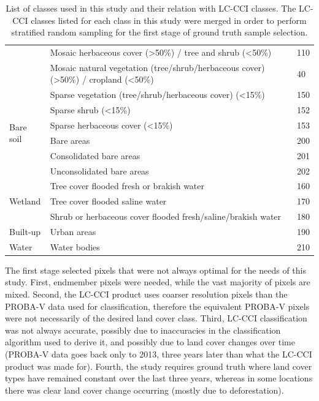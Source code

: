 \documentclass[a4paper,10pt]{book}
\begin{document}
\begin{table}
\begin{center}
{\begin{tabular}{lp{9cm}l}
	  & Mosaic herbaceous cover (>50\%) / tree and shrub (<50\%) & 110 \\
	  & Mosaic natural vegetation (tree/shrub/herbaceous cover) (>50\%) / cropland (<50\%) & 40 \\
	\hline
	\multirow{6}{*}{Bare soil} & Sparse vegetation (tree/shrub/herbaceous cover) (<15\%) & 150 \\
	  & Sparse shrub (<15\%) & 152 \\
	  & Sparse herbaceous cover (<15\%) & 153 \\
	  & Bare areas & 200 \\
	  & Consolidated bare areas & 201 \\
	  & Unconsolidated bare areas & 202 \\
	\hline
	\multirow{3}{*}{Wetland} & Tree cover flooded fresh or brakish water & 160 \\
	  & Tree cover flooded saline water & 170 \\
	  & Shrub or herbaceous cover flooded fresh/saline/brakish water & 180 \\
	\hline
	Built-up & Urban areas & 190 \\
	\hline
	Water & Water bodies & 210 \\
	\hline
      \end{tabular}
    }
  \end{center}
  \caption{List of classes used in this study and their relation with LC-CCI classes. The LC-CCI classes listed for each class in this study were merged in order to perform stratified random sampling for the first stage of ground truth sample selection.}
  \label{tbl-classes}
\end{table}

The first stage selected pixels that were not always optimal for the needs of this study. First, endmember pixels were needed, while the vast majority of pixels are mixed. Second, the LC-CCI product uses coarser resolution pixels than the PROBA-V data used for classification, therefore the equivalent PROBA-V pixels were not necessarily of the desired land cover class. Third, LC-CCI classification was not always accurate, possibly due to inaccuracies in the classification algorithm used to derive it, and possibly due to land cover changes over time (PROBA-V data goes back only to 2013, three years later than what the LC-CCI product was made for). Fourth, the study requires ground truth where land cover types have remained constant over the last three years, whereas in some locations there was clear land cover change occurring (mostly due to deforestation).
\end{document}
